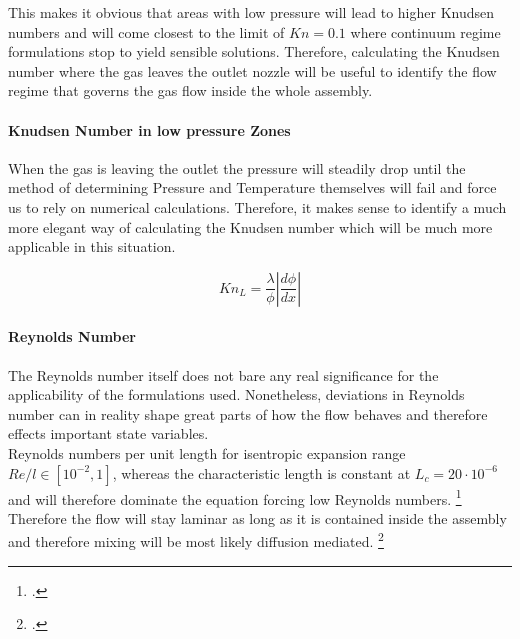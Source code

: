 	This makes it obvious that areas with low pressure will lead to higher Knudsen numbers and will come closest to the limit of $Kn=0.1$ where continuum regime formulations stop to yield sensible solutions.
	Therefore, calculating the Knudsen number where the gas leaves the outlet nozzle will be useful to identify the flow regime that governs the gas flow inside the whole assembly.

\paragraph{Knudsen Number in low pressure Zones}

	When the gas is leaving the outlet the pressure will steadily drop until the method of determining Pressure and Temperature themselves will fail and force us to rely on numerical calculations.
	Therefore, it makes sense to identify a much more elegant way of calculating the Knudsen number which will be much more applicable in this situation.

	$$
	K n_L = \frac{\lambda}{\phi} \left| \frac{d\phi}{dx} \right|
	$$

\paragraph{Reynolds Number}

	The Reynolds number itself does not bare any real significance for the applicability of the formulations used. Nonetheless, deviations in Reynolds number can in reality shape great parts of how the flow behaves and therefore effects important state variables.\\
	Reynolds numbers per unit length for isentropic expansion range $Re/l \in [10^{-2}, 1]$, whereas the characteristic length is constant at $L_c = 20\cdot 10^{-6}$ and will therefore dominate the equation forcing low Reynolds numbers. \footcite[][681]{ames1953compressible}\\
	Therefore the flow will stay laminar as long as it is contained inside the assembly and therefore mixing will be most likely diffusion mediated.
	\footcite[][16]{comsol_microfluidics_guide} 
